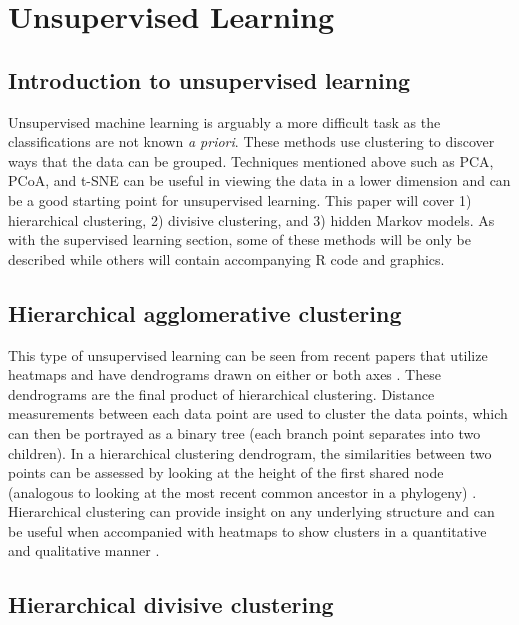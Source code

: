 \documentclass[12pt,openany]{book}
\begin{document}
\chapter{Unsupervised Learning}\label{unsup_learn}

\section{Introduction to unsupervised
learning}\label{introduction-to-unsupervised-learning}

Unsupervised machine learning is arguably a more difficult task as the
classifications are not known \emph{a priori}. These methods use
clustering to discover ways that the data can be grouped. Techniques
mentioned above such as PCA, PCoA, and t-SNE can be useful in viewing
the data in a lower dimension and can be a good starting point for
unsupervised learning. This paper will cover 1) hierarchical clustering,
2) divisive clustering, and 3) hidden Markov models. As with the
supervised learning section, some of these methods will be only be
described while others will contain accompanying R code and graphics.

\section{Hierarchical agglomerative
clustering}\label{hierarchical-agglomerative-clustering}

This type of unsupervised learning can be seen from recent papers that
utilize heatmaps and have dendrograms drawn on either or both axes
\citep{buggert2018identification, byrd2017staphylococcus}. These
dendrograms are the final product of hierarchical clustering. Distance
measurements between each data point are used to cluster the data
points, which can then be portrayed as a binary tree (each branch point
separates into two children). In a hierarchical clustering dendrogram,
the similarities between two points can be assessed by looking at the
height of the first shared node (analogous to looking at the most recent
common ancestor in a phylogeny) \citep{cluster}. Hierarchical clustering
can provide insight on any underlying structure and can be useful when
accompanied with heatmaps to show clusters in a quantitative and
qualitative manner \citep{cluster}.

\section{Hierarchical divisive
clustering}\label{hierarchical-divisive-clustering}
\end{document}
